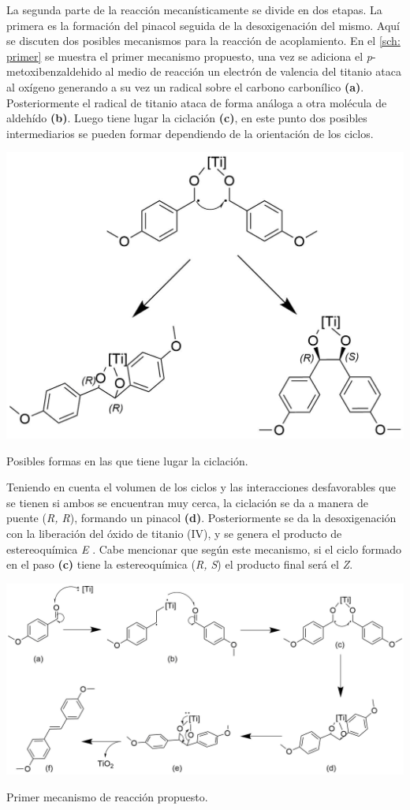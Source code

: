 \documentclass[fleqn,11pt]{SelfArx}
\begin{document}
La segunda parte de la reacci\'on mecan\'isticamente se divide en dos etapas. La primera es la formaci\'on del pinacol seguida de la desoxigenaci\'on del mismo. Aquí se discuten dos posibles mecanismos para la reacci\'on de acoplamiento. En el \autoref{sch: primer} se muestra el primer mecanismo propuesto, una vez se adiciona el \textit{p}-metoxibenzaldehido al medio de reacci\'on un electr\'on de valencia del titanio ataca al ox\'igeno generando a su vez un radical sobre el carbono carbon\'ilico \textbf{(a)}. Posteriormente el radical de titanio ataca de forma an\'aloga a otra mol\'ecula de aldeh\'ido \textbf{(b)}. Luego tiene lugar la ciclaci\'on \textbf{(c)}, en este punto dos posibles intermediarios se pueden formar dependiendo de la orientaci\'on de los ciclos.
\begin{scheme}[h]
	\centering
	\includegraphics[width = 0.8\linewidth]{structures/EZdetermined.png}
	\caption{Posibles formas en las que tiene lugar la ciclaci\'on.}
	\label{sch: EZ}
\end{scheme}

Teniendo en cuenta el volumen de los ciclos y las interacciones desfavorables que se tienen si ambos se encuentran muy cerca, la ciclaci\'on se da a manera de puente (\textit{R, R}), formando un pinacol \textbf{(d)}. Posteriormente se da la desoxigenaci\'on con la liberaci\'on del \'oxido de titanio (IV), y se genera el producto de estereoqu\'imica \textit{E} \cite{richards2001}. Cabe mencionar que seg\'un este mecanismo, si el ciclo formado en el paso \textbf{(c)} tiene la estereoqu\'imica (\textit{R, S}) el producto final ser\'a el \textit{Z}.
\begin{scheme}[h]
	\centering
	\includegraphics[width = \linewidth]{structures/mechanism.png}
	\caption{Primer mecanismo de reacci\'on propuesto.}
	\label{sch: primer}
\end{scheme}
\end{document}
